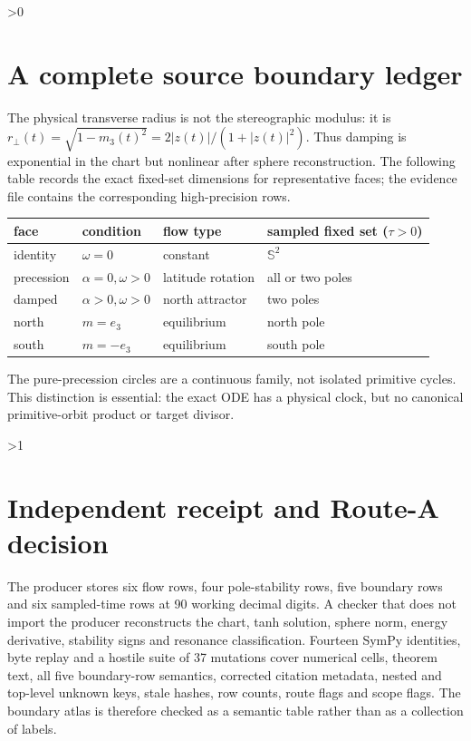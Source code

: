 \documentclass[10pt]{article}
\newcommand{\Sph}{\mathbb S^2}
\begin{document}
\ifnum\CRevisionRound>0
\section{A complete source boundary ledger}
The physical transverse radius is not the stereographic modulus: it is
\(r_\perp(t)=\sqrt{1-m_3(t)^2}=2|z(t)|/(1+|z(t)|^2)\).  Thus damping is
exponential in the chart but nonlinear after sphere reconstruction.  The
following table records the exact fixed-set dimensions for representative
faces; the evidence file contains the corresponding high-precision rows.
\begin{center}
\small
\begin{tabular}{llll}
\toprule
face & condition & flow type & sampled fixed set (\(\tau>0\))\\
\midrule
identity & \(\omega=0\) & constant & \(\Sph\)\\
precession & \(\alpha=0,\omega>0\) & latitude rotation & all or two poles\\
damped & \(\alpha>0,\omega>0\) & north attractor & two poles\\
north & \(m=e_3\) & equilibrium & north pole\\
south & \(m=-e_3\) & equilibrium & south pole\\
\bottomrule
\end{tabular}
\end{center}
The pure-precession circles are a continuous family, not isolated primitive
cycles.  This distinction is essential: the exact ODE has a physical clock,
but no canonical primitive-orbit product or target divisor.
\fi

\ifnum\CRevisionRound>1
\section{Independent receipt and Route-A decision}
The producer stores six flow rows, four pole-stability rows, five boundary
rows and six sampled-time rows at 90 working decimal digits.  A checker that
does not import the producer reconstructs the chart, tanh solution, sphere
norm, energy derivative, stability signs and resonance classification.
Fourteen SymPy identities, byte replay and a hostile suite of 37 mutations
cover numerical cells, theorem text, all five boundary-row semantics,
corrected citation metadata, nested and top-level unknown keys, stale hashes,
row counts, route flags and scope flags.  The boundary atlas is therefore
checked as a semantic table rather than as a collection of labels.
\end{document}
